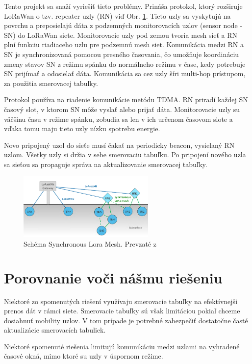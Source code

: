 \documentclass[slovak,master]{diploma}
\begin{document}
Tento projekt sa snaží vyriešiť tieto problémy. Prináša protokol, ktorý rozširuje LoRaWan o tzv. repeater uzly (RN) viď Obr. \ref{fig:synchronouslora}. Tieto uzly sa vyskytujú na povrchu a preposielajú dáta z 
podzemných monitorovacích uzlov (sensor node  - SN) do LoRaWan siete. Monitorovacie uzly pod zemou tvoria mesh sieť a RN plní funkciu riadiaceho uzlu pre podzemnú mesh siet. 
Komunikácia medzi RN a SN je synchronizovaná pomocou presného časovania, čo umožňuje koordináciu zmeny stavov SN z režimu spánku do normálneho režimu v čase, kedy 
potrebuje SN prijímať a odosielať dáta. Komunikácia sa cez uzly šíri multi-hop prístupom, za použitia smerovacej tabulky.

Protokol používa na riadenie komunikácie metódu TDMA. RN priradí každej SN časový slot, v ktorom SN môže vyslať alebo prijať dáta.
Monitorovacie uzly su väčšinu času v režime spánku, zobudia sa len v ich určenom časovom slote a vďaka tomu maju tieto uzly nízku spotrebu energie.

Novo pripojený uzol do sieťe musí čakať na periodicky beacon, vysielaný RN uzlom. Všetky uzly si držia v sebe smerovaciu tabuľku. Po pripojení nového uzla sa sieťou sa propaguje 
správa na aktualizovanie smerovacej tabuľky.

\begin{figure}
	\centering
	\includegraphics[width=0.6\textwidth]{Figures/synchronouslorameshnetwork.png}
	\caption{Schéma Synchronous Lora Mesh. Prevzaté z \cite{synchronouslorameshnetwork}}
	\label{fig:synchronouslora}
\end{figure}

\section{Porovnanie voči nášmu riešeniu}
Niektoré zo spomenutých riešení využívaju smerovacie tabuľky na efektívnejši prenos dát v rámci siete. Smerovacie tabuľky sú však limitáciou pokiaľ 
chceme dosiahnuť mobility uzlov. V tom prípade je potrebné zabezpečiť dostatočne časté aktualizácie smerovacích tabuliek.

Niektoré spomenuté riešenia limitujú komunikáciu medzi uzlami na vyhradené časové okná, mimo ktoré su uzly v úspornom režime.
\end{document}
